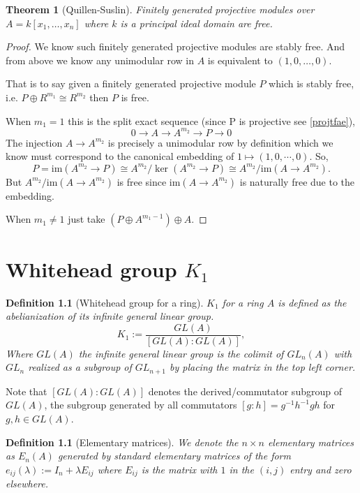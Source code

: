 \documentclass[12pt]{report}
\numberwithin{equation}{section}
\newcounter{dummy} \numberwithin{dummy}{section}
\newtheorem{theorem}[dummy]{Theorem}
\newtheorem{definition}[dummy]{Definition}
\begin{document}
	
	
	\begin{theorem}[Quillen-Suslin]
		Finitely generated projective modules over $A=k[x_1,\dots,x_n]$ where $k$ is a principal ideal domain are free.
	\end{theorem}
	\begin{proof}
		We know such finitely generated projective modules are stably free. And from above we know any unimodular row in $A$ is equivalent to $(1,0,\dots,0)$.
		
		That is to say given a finitely generated projective module $P$ which is stably free, i.e. $P \oplus R^{m_1} \cong R^{m_2}$ then $P$ is free.
		
		When $m_1=1$ this is the split exact sequence (since P is projective see \ref{projtfae}),
		\[ 0 \to A \to A^{m_2}  \to P \to 0 \]
		The injection $A \to A^{m_2}$ is precisely a unimodular row by definition which we know must correspond to the canonical embedding of $1 \mapsto (1,0,\cdots, 0)$.
		So,$$P = \mathrm{im}(A^{m_2} \to P) \cong A^{m_2}/\ker (A^{m_2} \to P) \cong A^{m_2}/\mathrm{im}(A \to A^{m_2}).$$
		But $A^{m_2}/\mathrm{im}(A \to A^{m_2})$ is free since $\mathrm{im}(A \to A^{m_2})$ is naturally free due to the embedding.
		
		When $m_1 \neq 1$ just take $(P \oplus A^{m_1-1}) \oplus A$.
	\end{proof}


	
	\chapter{Whitehead group $K_1$}
	\begin{definition}[Whitehead group for a ring] $K_1$ for a ring $A$ is defined as the abelianization of its infinite general linear group.
		$$K_1:= \frac{GL(A)}{[GL(A):GL(A)]},$$
		Where $GL(A)$ the infinite general linear group is the colimit of $GL_n(A)$ with $GL_{n}$ realized as a subgroup of $GL_{n+1}$ by placing the matrix in the top left corner. 
	\end{definition}
	Note that $[GL(A):GL(A)]$ denotes the derived/commutator subgroup of $GL(A)$, the subgroup generated by all commutators $[g:h]=g^{-1}h^{-1}gh$ for $g,h \in GL(A)$.
	\begin{definition}[Elementary matrices]
		We denote the $n\times n$ elementary matrices as $E_n(A)$ generated by standard elementary matrices of the form $e_{ij}(\lambda) := I_{n}+ \lambda E_{ij} $ where $E_{ij}$ is the matrix with $1$ in the $(i,j)$ entry and zero elsewhere.
	\end{definition}
	
\end{document}
